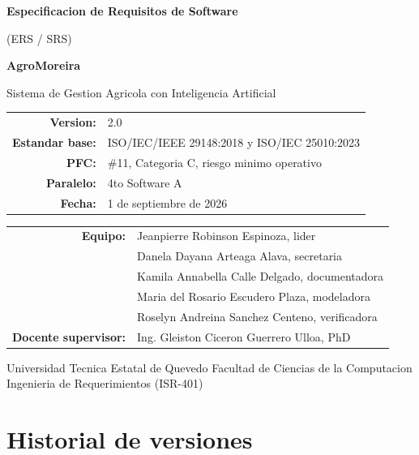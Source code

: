 \documentclass[11pt,a4paper]{article}
\begin{document}
\begin{titlepage}
\centering
\vspace*{2cm}
{\LARGE\bfseries Especificacion de Requisitos de Software\par}
\vspace{0.4cm}
{\large (ERS / SRS)\par}
\vspace{1.2cm}
{\Large\bfseries AgroMoreira\par}
{\large Sistema de Gestion Agricola con Inteligencia Artificial\par}
\vspace{2cm}
\begin{tabular}{rl}
\textbf{Version:} & 2.0 \\[2pt]
\textbf{Estandar base:} & ISO/IEC/IEEE 29148:2018 y ISO/IEC 25010:2023 \\[2pt]
\textbf{PFC:} & \#11, Categoria C, riesgo minimo operativo \\[2pt]
\textbf{Paralelo:} & 4to Software A \\[2pt]
\textbf{Fecha:} & 1 de septiembre de 2026 \\
\end{tabular}
\vspace{1.6cm}

\begin{tabular}{rl}
\textbf{Equipo:} & Jeanpierre Robinson Espinoza, lider \\
 & Danela Dayana Arteaga Alava, secretaria \\
 & Kamila Annabella Calle Delgado, documentadora \\
 & Maria del Rosario Escudero Plaza, modeladora \\
 & Roselyn Andreina Sanchez Centeno, verificadora \\[6pt]
\textbf{Docente supervisor:} & Ing. Gleiston Ciceron Guerrero Ulloa, PhD \\
\end{tabular}
\vfill
{\small Universidad Tecnica Estatal de Quevedo \textperiodcentered{} Facultad de Ciencias de la Computacion \textperiodcentered{} Ingenieria de Requerimientos (ISR-401)}
\end{titlepage}

\tableofcontents
\newpage

\section*{Historial de versiones}
\end{document}
